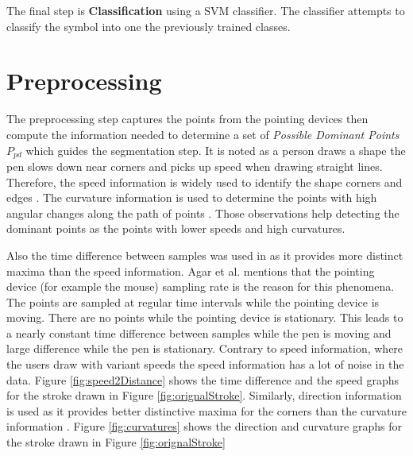    The final step is \textbf{Classification} using a SVM classifier. The classifier attempts to classify the symbol into one the previously trained classes.%
 



\section{Preprocessing}
\label{sec:Preprocessing}
The preprocessing step captures the points from the pointing devices then compute the information needed to determine a set of  \textit{Possible Dominant Points $P_{pd}$} which guides the segmentation step. It is noted as a person draws a shape the pen slows down near corners and picks up speed when drawing straight lines. Therefore, the speed information is widely used to identify the shape corners and edges \cite{earlyprocess}. The curvature information is used to determine the points with high angular changes along the path of points \cite{meanshift10}. Those observations help detecting the dominant points as the points with lower speeds and high curvatures. 

Also the time difference between samples was used in \cite{polygonfeedback31} as it provides more distinct maxima than the speed information. Agar et al. \cite{polygonfeedback31} mentions that the pointing device (for example the mouse) sampling rate is the reason for this phenomena. The points are sampled at regular time intervals while the pointing device is moving. There are no points while the pointing device is stationary. This leads to a nearly constant time difference between samples while the pen is moving and large difference while the pen is stationary. Contrary to speed information, where the users draw with variant speeds the speed information has a lot of noise in the data. Figure \ref{fig:speed2Distance} shows the time difference and the speed graphs for the stroke drawn in Figure \ref{fig:orignalStroke}.  Similarly, direction information is used as it provides better distinctive maxima for the corners than the curvature information \cite{meanshift10}. Figure \ref{fig:curvatures} shows the direction and curvature graphs for the stroke drawn in Figure \ref{fig:orignalStroke}

